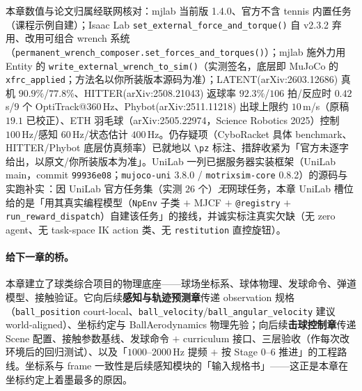 \begin{finenote}
本章数值与论文归属经联网核对：mjlab 当前版 1.4.0、官方不含 tennis 内置任务（课程示例自建）；Isaac Lab \verb|set_external_force_and_torque()| 自 v2.3.2 弃用、改用可组合 wrench 系统（\verb|permanent_wrench_composer.set_forces_and_torques()|）；mjlab 施外力用 Entity 的 \verb|write_external_wrench_to_sim()|（实测签名，底层即 MuJoCo 的 \verb|xfrc_applied|；方法名以你所装版本源码为准）；LATENT(arXiv:2603.12686) 真机 $90.9\%$/$77.8\%$、HITTER(arXiv:2508.21043) 返球率 $92.3\%$/$106$ 拍/反应时 $0.42$\,s/$9$ 个 OptiTrack@$360$\,Hz、Phybot(arXiv:2511.11218) 出球上限约 $10$\,m/s（原稿 $19.1$ 已校正）、ETH 羽毛球（arXiv:2505.22974，Science Robotics 2025）控制 $100$\,Hz/感知 $60$\,Hz/状态估计 $400$\,Hz。仍存疑项（CyboRacket 具体 benchmark、HITTER/Phybot 底层仿真频率）已就地以 \texttt{\textbackslash pz} 标注、措辞收紧为「官方未逐字给出，以原文/你所装版本为准」。UniLab 一列已据服务器实装框架（UniLab main，commit \texttt{99936e08}；\verb|mujoco-uni| 3.8.0 / \verb|motrixsim-core| 0.8.2）的源码与实跑补实\,\cite{unilab2026}：因 UniLab 官方任务集（实测 $26$ 个）\emph{无}网球任务，本章 UniLab 槽位给的是「用其真实编程模型（\verb|NpEnv| 子类 $+$ MJCF $+$ \verb|@registry| $+$ \verb|run_reward_dispatch|）自建该任务」的接线，并诚实标注真实欠缺（无 zero agent、无 task-space IK action 类、无 \verb|restitution| 直控旋钮）。
\end{finenote}

\paragraph{给下一章的桥。}本章建立了球类综合项目的物理底座——球场坐标系、球体物理、发球命令、弹道模型、接触验证。它向后续\textbf{感知与轨迹预测章}传递 observation 规格（\verb|ball_position| court-local、\verb|ball_velocity|/\verb|ball_angular_velocity| 建议 world-aligned）、坐标约定与 BallAerodynamics 物理先验；向后续\textbf{击球控制章}传递 Scene 配置、接触参数基线、发球命令 $+$ curriculum 接口、三层验收（作每次改环境后的回归测试）、以及「$1000$--$2000$\,Hz 提频 $+$ 按 Stage 0--6 推进」的工程路线。坐标系与 frame 一致性是后续感知模块的「输入规格书」——这正是本章在坐标约定上着墨最多的原因。
